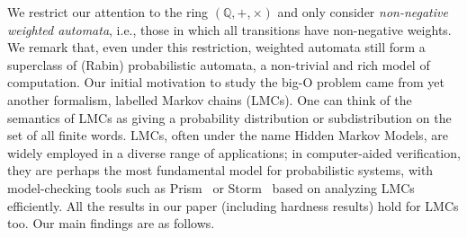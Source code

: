 \documentclass[10pt,a4paper]{amsart}
\numberwithin{equation}{section}
\theoremstyle{plain}
\theoremstyle{definition}
\theoremstyle{remark}
\begin{document}
We restrict our attention to
the ring $(\mathbb Q, {+}, {\times})$ and
only consider \emph{non-negative weighted automata},
i.e., those in which all transitions have non-negative weights.
We remark that, even under this restriction,
weighted automata still form a superclass of
(Rabin) probabilistic automata, a non-trivial and rich model of computation.
Our initial motivation to study the big-O problem came from yet another formalism,
labelled Markov chains (LMCs).
One can think of the semantics of LMCs as giving a probability distribution
or subdistribution on the set of all finite words.
LMCs, often under the name Hidden Markov Models, are widely employed in
a diverse range of applications;
in computer-aided verification, they are perhaps the most fundamental model for
probabilistic systems, with model-checking tools such as Prism~\cite{KNP11} or
Storm~\cite{Storm} based on analyzing LMCs efficiently.
All the results in our paper (including hardness results) hold for LMCs too. Our main findings are as follows.
\end{document}
